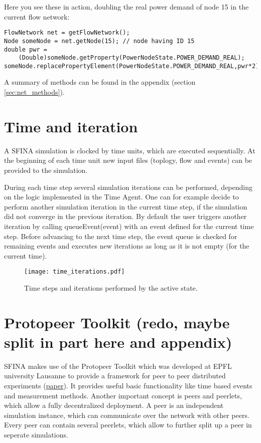 \documentclass[11pt,fleqn]{book} %
\newcommand{\TimeAgent}{Time Agent}
\begin{document}
Here you see these in action, doubling the real power demand of node 15 in the current flow network:
\begin{lstlisting}[frame=single] 
FlowNetwork net = getFlowNetwork();
Node someNode = net.getNode(15); // node having ID 15
double pwr = 
	(Double)someNode.getProperty(PowerNodeState.POWER_DEMAND_REAL);
someNode.replacePropertyElement(PowerNodeState.POWER_DEMAND_REAL,pwr*2);
\end{lstlisting}

A summary of methods can be found in the appendix (section \ref{sec:net_methods}).

\section{Time and iteration}
A SFINA simulation is clocked by time units, which are executed sequentially. At the beginning of each time unit new input files (toplogy, flow and events) can be provided to the simulation.

During each time step several simulation iterations can be performed, depending on the logic implemented in the \TimeAgent{}. One can for example decide to perform another simulation iteration in the current time step, if the simulation did not converge in the previous iteration. By default the user triggers another iteration by calling queueEvent(event) with an event defined for the current time step. Before advancing to the next time step, the event queue is checked for remaining events and executes new iterations as long as it is not empty (for the current time).

\begin{figure}[!h]
\centering\texttt{[image: time\_iterations.pdf]}
\caption{Time steps and iterations performed by the active state.}
\label{fig:time_iter}
\end{figure}


\section{Protopeer Toolkit (redo, maybe split in part here and appendix)}\label{subsec:protopeer}
SFINA makes use of the Protopeer Toolkit which was developed at EPFL university Lausanne to provide a framework for peer to peer distributed experiments (\href{http://infoscience.epfl.ch/record/128659/files/protopeer_demo.pdf}{paper}). It provides useful basic functionality like time based events and measurement methods. Another important concept is peers and peerlets, which allow a fully decentralized deployment. A peer is an independent simulation instance, which can communicate over the network with other peers. Every peer can contain several peerlets, which allow to further split up a peer in seperate simulations. %
\end{document}
